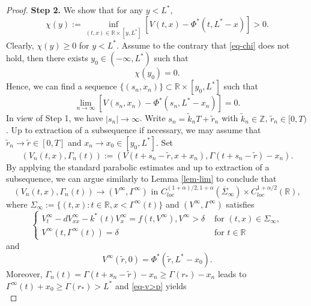 \documentclass[11pt]{amsart}
\numberwithin{equation}{section}
\begin{document}
\begin{proof}
 \textbf{ Step 2.} We show that for any $y<L^*$, 
 \begin{equation}\label{eq-chi}
  \chi (y):=\inf_{(t,x)\in\mathbb{R}\times[y,L^*]}[V(t,x)-\Phi^*(t,L^*-x)]>0.
 \end{equation}
Clearly, $\chi(y)\geq 0$ for $y<L^*$. Assume to the contrary that \eqref{eq-chi} does not hold,  then there exists  $y_0\in(-\infty,L^*)$ such that 
\begin{equation*}
  \chi(y_0)=0.
\end{equation*}
Hence, we can find a sequence $\{(s_n,x_n)\}\subset \mathbb{R}\times [y_0,L^*]$ such that 
\begin{equation*}
  \lim_{n\to\infty}[V(s_n,x_n)-\Phi^*(s_n,L^*-x_n)]=0.
\end{equation*}
In view of Step 1, we have $|s_n|\to\infty$. Write $s_n=\tilde{k}_nT+\tilde{r}_n$ with $\tilde{k}_n\in\mathbb Z$, $\tilde r_n\in [0, T)$. Up to extraction of a subsequence if necessary, we may assume that $\tilde{r}_n\to\tilde{r}\in[0,T]$ and $x_n\to x_0\in[y_0,L^*]$. Set 
\begin{equation*}
  (V_n(t,x), \Gamma_n(t)):=(V(t+s_n-\tilde{r},x+x_n),\Gamma(t+s_n-\tilde{r})-x_n).
\end{equation*} 
 By applying the standard parabolic estimates and up to extraction of a subsequence,  we can argue similarly  to  Lemma \ref{lem-lim} to conclude that 
 \begin{equation*}
  (V_n(t,x), \Gamma_n(t))\to (V^\infty,\Gamma^\infty) \text{ in }C_{loc}^{(1+\alpha)/2,1+\alpha}(\overline{\Sigma}_\infty)\times C_{loc}^{1+\alpha/2}(\mathbb{R}),
 \end{equation*}
 where ${\Sigma}_\infty:=\{(t,x):t\in\mathbb{R},x<\Gamma^\infty(t)\}$ and $(V^\infty,\Gamma^\infty)$ satisfies
\begin{equation}\label{eq-Vinf}\begin{cases}
  V^\infty_t-dV^\infty_{xx}-k^*(t)V^\infty_x=f(t,V^\infty), V^\infty>\delta &\text{ for }(t,x)\in{\Sigma}_\infty,\\
  V^\infty(t,\Gamma^\infty(t))=\delta &\text{ for }t\in\mathbb R
\end{cases}
\end{equation}
and 
\begin{equation}\label{eq-Vin}
  V^\infty(\tilde{r},0)=\Phi^*(\tilde{r}, L^*-x_0).
\end{equation}
Moreover, $\Gamma_n(t)=\Gamma(t+s_n-\tilde{r})-x_n\geq \Gamma(r_*)-x_n $ leads to
 $\Gamma^\infty(t)+x_0\geq \Gamma(r_*)>L^*$ and \eqref{eq-v>p} yields
\begin{equation*}

\end{equation*}
\end{proof}
\end{document}
